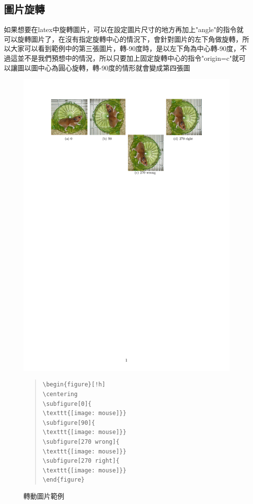 \documentclass[12pt,a4paper]{report}
\begin{document}
\begin{CJK}{UTF8}{bkai}
\section{圖片旋轉}
\noindent 如果想要在latex中旋轉圖片，可以在設定圖片尺寸的地方再加上"angle"的指令就可以旋轉圖片了，在沒有指定旋轉中心的情況下，會針對圖片的左下角做旋轉，所以大家可以看到範例中的第三張圖片，轉-90度時，是以左下角為中心轉-90度，不過這並不是我們預想中的情況，所以只要加上固定旋轉中心的指令"origin=c"就可以讓圖以圖中心為圓心旋轉，轉-90度的情形就會變成第四張圖
\begin{figure}[!h] 
\begin{minipage}[b]{0.5\textwidth} 
\centering 
\includegraphics[scale=0.4]{./pics/rotate_example.pdf} 
\end{minipage}%
\begin{minipage}[b]{0.5\textwidth} 
\begin{footnotesize}
\begin{quote}
\begin{verbatim}
\begin{figure}[!h]
\centering
\subfigure[0]{
\texttt{[image: mouse]}}
\subfigure[90]{
\texttt{[image: mouse]}}
\subfigure[270 wrong]{
\texttt{[image: mouse]}}
\subfigure[270 right]{
\texttt{[image: mouse]}}
\end{figure}
\end{verbatim}
\end{quote}
\end{footnotesize}
\end{minipage} 
\caption{轉動圖片範例}
\end{figure}


\end{CJK}
\end{document}
